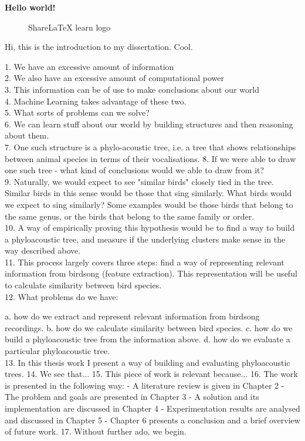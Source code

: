 \documentclass[../main.tex]{subfiles}
\begin{document}
\textbf{Hello world!}
 
\begin{figure}[bh]
\centering
 
\label{fig:img1}
\caption{ShareLaTeX learn logo}
\end{figure}
 
Hi, this is the introduction to my dissertation. Cool.

1. We have an excessive amount of information\\
2. We also have an excessive amount of computational power\\
3. This information can be of use to make conclusions about our world\\
4. Machine Learning takes advantage of these two.\\
5. What sorts of problems can we solve? \\
6. We can learn stuff about our world by building structures and then reasoning about them. \\
7. One such structure is a phylo-acoustic tree, i.e. a tree that shows relationships between animal species in terms of their vocalisations. 
8. If we were able to draw one such tree - what kind of conclusions would we able to draw from it? \\
9. Naturally, we would expect to see "similar birds" closely tied in the tree. Similar birds in this sense would be those that sing similarly. What birds would we expect to sing similarly? Some examples would be those birds that belong to the same genus, or the birds that belong to the same family or order. \\
10. A way of empirically proving this hypothesis would be to find a way to build a phyloacoustic tree, and measure if the underlying clusters make sense in the way described above.\\
11. This process largely covers three steps: find a way of representing relevant information from birdsong (feature extraction). This representation will be useful to calculate similarity between bird species. \\
12. What problems do we have:

a. how do we extract and represent relevant information from birdsong recordings.
b. how do we calculate similarity between bird species.
c. how do we build a phyloacoustic tree from the information above.
d. how do we evaluate a particular phyloacoustic tree.\\
13. In this thesis work I present a way of building and evaluating phyloacoustic trees. 
14. We see that...
15. This piece of work is relevant because...
16. The work is presented in the following way:
- A literature review is given in Chapter 2
- The problem and goals are presented in Chapter 3
- A solution and its implementation are discussed in Chapter 4
- Experimentation results are analysed and discussed in Chapter 5
- Chapter 6 presents a conclusion and a brief overview of future work.
17. Without further ado, we begin. \cite{Awatade2012}
\end{document}
